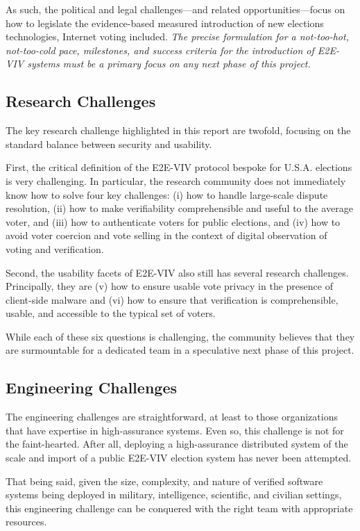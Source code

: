 As such, the political and legal challenges---and related
opportunities---focus on how to legislate the evidence-based measured
introduction of new elections technologies, Internet voting
included. \emph{The precise formulation for a not-too-hot,
  not-too-cold pace, milestones, and success criteria for the
  introduction of E2E-VIV systems must be a primary focus on any next
  phase of this project.}

\subsection{Research Challenges}

The key research challenge highlighted in this report are twofold,
focusing on the standard balance between security and usability.

First, the critical definition of the E2E-VIV protocol bespoke for
U.S.A. elections is very challenging. In particular, the research
community does not immediately know how to solve four key challenges:
(i) how to handle large-scale dispute resolution, (ii) how to make
verifiability comprehensible and useful to the average voter, and
(iii) how to authenticate voters for public elections, and (iv) how to
avoid voter coercion and vote selling in the context of digital
observation of voting and verification.

Second, the usability facets of E2E-VIV also still has several
research challenges. Principally, they are (v) how to ensure usable vote
privacy in the presence of client-side malware and (vi) how to ensure
that verification is comprehensible, usable, and accessible to the
typical set of voters.

While each of these six questions is challenging, the community
believes that they are surmountable for a dedicated team in a
speculative next phase of this project.

\subsection{Engineering Challenges}

The engineering challenges are straightforward, at least to those
organizations that have expertise in high-assurance systems. Even so,
this challenge is not for the faint-hearted. After all, deploying a
high-assurance distributed system of the scale and import of a public
E2E-VIV election system has never been attempted. 

That being said, given the size, complexity, and nature of verified
software systems being deployed in military, intelligence, scientific,
and civilian settings, this engineering challenge can be conquered
with the right team with appropriate resources.

